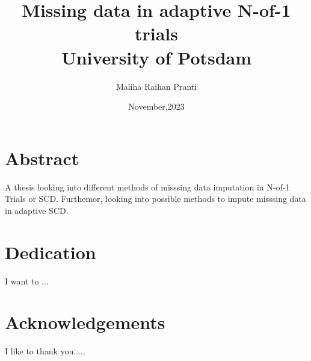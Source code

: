 \documentclass[a4paper]{report}
\title{Missing data in adaptive N-of-1 trials\\
{\Large University of Potsdam}}
\author{Maliha Raihan Pranti}
\date{November,2023}
\begin{document}
\maketitle

\chapter*{Abstract}
A thesis looking into different methods of misssing data imputation in N-of-1 Trials or SCD. Furthemor, looking into possible methods to impute misssing data
in adaptive SCD.

\chapter*{Dedication}
I want to ...

\chapter*{Acknowledgements}
I like to thank you.....

\tableofcontents

\listoffigures











\appendix




\end{document}
